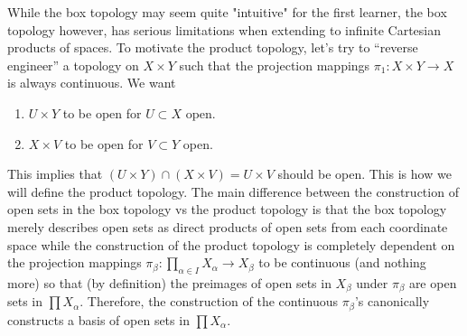   While the box topology may seem quite "intuitive" for the first learner, the box topology however, has serious limitations when extending to infinite Cartesian products of spaces. To motivate the product topology, let's try to ``reverse engineer'' a topology on $X \times Y$ such that the projection mappings $\pi_1: X \times Y \rightarrow X$ is always continuous. We want 
  \begin{enumerate}
    \item $U \times Y$ to be open for $U \subset X$ open. 
    \item $X \times V$ to be open for $V \subset Y$ open. 
  \end{enumerate}
  This implies that $(U \times Y) \cap (X \times V) = U \times V$ should be open. This is how we will define the product topology. The main difference between the construction of open sets in the box topology vs the product topology is that the box topology merely describes open sets as direct products of open sets from each coordinate space while the construction of the product topology is completely dependent on the projection mappings $\pi_\beta: \prod_{\alpha \in I} X_\alpha \rightarrow X_\beta$ to be continuous (and nothing more) so that (by definition) the preimages of open sets in $X_\beta$ under $\pi_\beta$ are open sets in $\prod X_\alpha$. Therefore, the construction of the continuous $\pi_\beta$'s canonically constructs a basis of open sets in $\prod X_\alpha$. 

